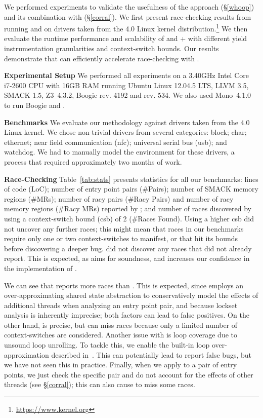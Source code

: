 We performed experiments to validate the usefulness of the \whoop approach (\S\ref{whoop}) and its combination with \corral (\S\ref{corral}). We first present race-checking results from running \whoop and \corral on \sizeOfBenchmarks drivers taken from the 4.0 Linux kernel distribution.\footnote{\url{https://www.kernel.org}} We then evaluate the runtime performance and scalability of \corral and \whoop + \corral with different yield instrumentation granularities and context-switch bounds.
Our results demonstrate that \whoop can efficiently accelerate race-checking with \corral.

\noindent\textbf{Experimental Setup }
%
We performed all experiments on a 3.40GHz Intel Core i7-2600 CPU with 16GB RAM running Ubuntu Linux 12.04.5 LTS, LLVM 3.5, SMACK 1.5, Z3~4.3.2, Boogie rev. 4192 and \corral rev. 534. We also used Mono~4.1.0 to run Boogie and \corral.

\noindent\textbf{Benchmarks }
%
We evaluate our methodology against \sizeOfBenchmarks drivers taken from the 4.0 Linux kernel. We chose non-trivial drivers from several categories: block; char; ethernet; near field communication (nfc); universal serial bus (usb); and watchdog. We had to manually model the environment for these drivers, a process that required approximately two months of work.

\noindent\textbf{Race-Checking }
%
Table~\ref{tab:stats} presents statistics for all our benchmarks: lines of code (LoC); number of entry point pairs (\#Pairs); number of SMACK memory regions (\#MRs); number of racy pairs (\#Racy Pairs) and number of racy memory regions (\#Racy MRs) reported by \whoop; and number of races discovered by \corral using a context-switch bound (csb) of 2 (\#Races Found). Using a higher csb did not uncover any further races; this might mean that races in our benchmarks require only one or two context-switches to manifest, or that \corral hit its bounds before discovering a deeper bug. \corral did not discover any races that \whoop did not already report.  This is expected, as \whoop aims for soundness, and increases our confidence in the implementation of \whoop.

We can see that \whoop reports more races than \corral. This is expected, since \whoop employs an over-approximating shared state abstraction to conservatively model the effects of additional threads when analyzing an entry point pair, and because lockset analysis is inherently imprecise; both factors can lead to false positives.  On the other hand, \corral is precise, but can miss races because only a limited number of context-switches are considered.  Another issue with \corral is loop coverage due to unsound loop unrolling. To tackle this, we enable the built-in loop over-approximation described in~\cite{lal2014powering}. This can potentially lead \corral to report false bugs, but we have not seen this in practice. Finally, when we apply \corral to a pair of entry points, we just check the specific pair and do not account for the effects of other threads (see \S\ref{corral}); this can also cause \corral to miss some races.


